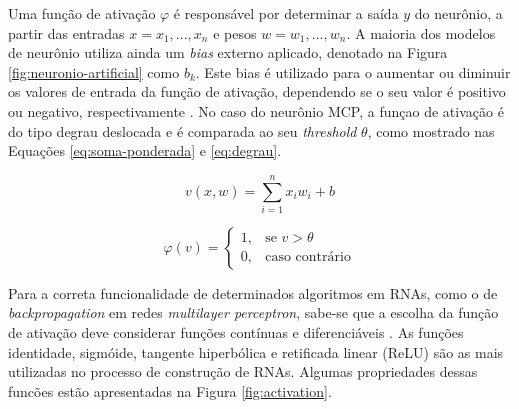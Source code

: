 Uma função de ativação $\varphi$ é responsável por determinar a saída $y$ do neurônio, a partir das entradas $x = x_1, ..., x_n$ e pesos $w = w_1, ..., w_n$. A maioria dos modelos de neurônio utiliza ainda um \emph{bias} externo aplicado, denotado na Figura \ref{fig:neuronio-artificial} como $b_k$. Este bias é utilizado para o aumentar ou diminuir os valores de entrada da função de ativação, dependendo se o seu valor é positivo ou negativo, respectivamente \cite{haykin}. No caso do neurônio MCP, a funçao de ativação é do tipo degrau deslocada e é comparada ao seu \emph{threshold} $\theta$, como mostrado nas Equações \ref{eq:soma-ponderada} e \ref{eq:degrau}.

\begin{equation}
  \label{eq:soma-ponderada}
  v(x,w) = \sum\limits_{i=1}^n x_i w_i + b
\end{equation}

\begin{equation}
\label{eq:degrau}
\varphi(v) = \left\{
\begin{array}{lr}
  1, & \text{se } v > \theta\\
  0, & \text{caso contrário}
\end{array}
\right.
\end{equation}

Para a correta funcionalidade de determinados algoritmos em RNAs, como o de \emph{backpropagation} em redes \emph{multilayer perceptron}, sabe-se que a escolha da função de ativação deve considerar funções contínuas e diferenciáveis \cite{haykin}. As funções identidade, sigmóide, tangente hiperbólica e retificada linear (ReLU) são as mais utilizadas no processo de construção de RNAs. Algumas propriedades dessas funcões estão apresentadas na Figura \ref{fig:activation}.

